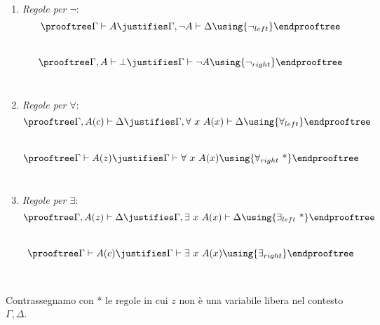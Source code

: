 \begin{enumerate}
\item[] \textit{Regole per $\neg$}:\\
$$\prooftree
  \Gamma \vdash A
   \justifies
 \Gamma, \neg A \vdash \Delta
 \using
 {\neg_{left}}
\endprooftree$$\\
$$\prooftree
  \Gamma, A \vdash \bot
   \justifies
 \Gamma \vdash \neg A
 \using
 {\neg_{right}}
\endprooftree$$\\

\item[] \textit{Regole per $\forall$}:\\
$$\prooftree
  \Gamma, A(c) \vdash \Delta
   \justifies
 \Gamma, \forall\ x\ A(x) \vdash \Delta
 \using
 {\forall_{left}}
\endprooftree$$\\
$$\prooftree
  \Gamma \vdash A(z)
   \justifies
 \Gamma \vdash \forall\ x\ A(x)
 \using
 {\forall_{right}\ \mbox{*}}
\endprooftree$$\\

\item[] \textit{Regole per $\exists$}:\\
$$\prooftree
  \Gamma, A(z) \vdash \Delta
   \justifies
 \Gamma, \exists\ x\ A(x) \vdash \Delta
 \using
 {\exists_{left}\ \mbox{*}}
\endprooftree$$\\
$$\prooftree
  \Gamma \vdash A(c)
   \justifies
 \Gamma \vdash \exists\ x\ A(x)
 \using
 {\exists_{right}}
\endprooftree$$

\end{enumerate}
\par\ \par\noindent
\vspace{.3cm}

Contrassegnamo con * le regole in cui $z$ non \`e una variabile libera nel contesto $\Gamma, \Delta$.\\

